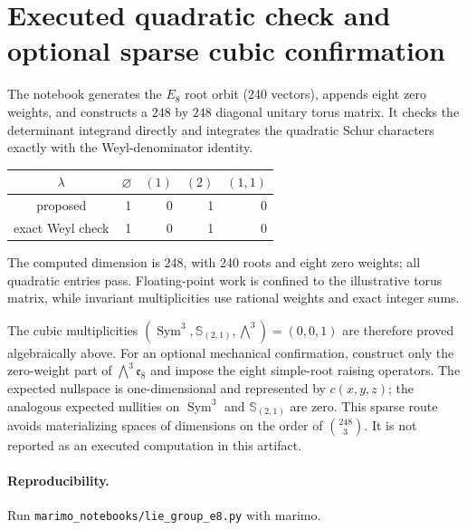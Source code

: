 \documentclass[10pt]{article}
\begin{document}
\section{Executed quadratic check and optional sparse cubic confirmation}
The notebook generates the $E_8$ root orbit (240 vectors), appends eight zero
weights, and constructs a $248$ by $248$ diagonal unitary torus matrix.  It
checks the determinant integrand directly and integrates the quadratic Schur
characters exactly with the Weyl-denominator identity.
\begin{center}\small
\begin{tabular}{@{}c|rrrr@{}}\toprule
$\lambda$&$\varnothing$&$(1)$&$(2)$&$(1,1)$\\\midrule
proposed&1&0&1&0\\
exact Weyl check&1&0&1&0\\\bottomrule
\end{tabular}
\end{center}
The computed dimension is 248, with 240 roots and eight zero weights; all
quadratic entries pass.  Floating-point work is confined to the illustrative
torus matrix, while invariant multiplicities use rational weights and exact
integer sums.

The cubic multiplicities
$(\operatorname{Sym}^3,\mathbb S_{(2,1)},\bigwedge^3)=(0,0,1)$ are therefore
proved algebraically above.  For an optional mechanical confirmation,
construct only the zero-weight part of
$\bigwedge^3\mathfrak e_8$ and impose the eight simple-root raising operators.
The expected nullspace is one-dimensional and represented by $c(x,y,z)$; the
analogous expected nullities on $\operatorname{Sym}^3$ and
$\mathbb S_{(2,1)}$ are zero.  This sparse route avoids materializing spaces
of dimensions on the order of $\binom{248}{3}$.  It is not reported as an
executed computation in this artifact.

\paragraph{Reproducibility.} Run \texttt{marimo\_notebooks/lie\_group\_e8.py} with marimo.
\end{document}
